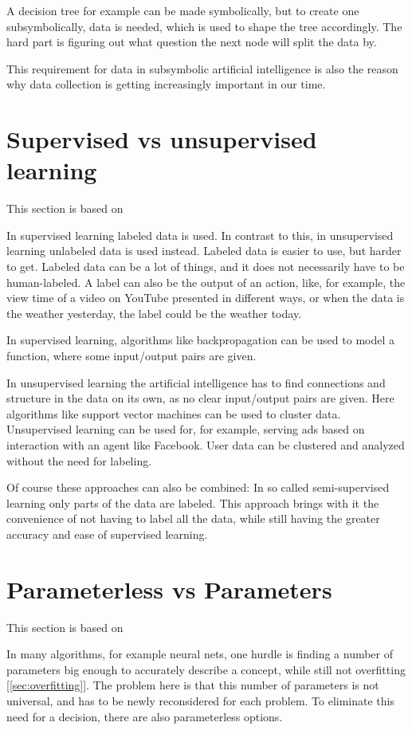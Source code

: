 A decision tree for example can be made symbolically, but to create one subsymbolically, data is needed, which is used to shape the tree accordingly.
The hard part is figuring out what question the next node will split the data by. 

This requirement for data in subsymbolic artificial intelligence is also the reason why data collection is getting increasingly important in our time. 

\section{Supervised vs unsupervised learning} 
This section is based on \cite[p. 695f]{MA}

\label{sec:supervised}
In supervised learning labeled data is used. In contrast to this, in unsupervised learning unlabeled data is used instead. 
Labeled data is easier to use, but harder to get. Labeled data can be a lot of things, and it does not necessarily have to be human-labeled. A label can also be the output of an action, like, for example, the view time of a video on YouTube presented in different ways, or when the data is the weather yesterday, the label could be the weather today.

In supervised learning, algorithms like backpropagation can be used to model a function, where some input/output pairs are given.

In unsupervised learning the artificial intelligence has to find connections and structure in the data on its own, as no clear input/output pairs are given.
Here algorithms like support vector machines can be used to cluster data. Unsupervised learning can be used for, for example, serving ads based on interaction with an agent like Facebook. User data can be clustered and analyzed without the need for labeling.

Of course these approaches can also be combined: In so called semi-supervised learning only parts of the data are labeled. This approach brings with it the convenience of not having to label all the data, while still having the greater accuracy and ease of supervised learning. \cite{semisupervised}

\section{Parameterless vs Parameters} 
This section is based on \cite[p. 737f]{MA}

In many algorithms, for example neural nets, one hurdle is finding a number of parameters big enough to accurately describe a concept, while still not  overfitting [\autoref{sec:overfitting}]. The problem here is that this number of parameters is not universal, and has to be newly reconsidered for each problem. To eliminate this need for a decision, there are also parameterless options. 

